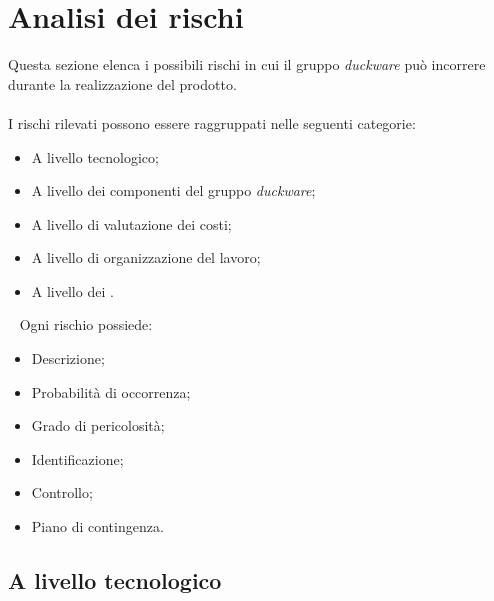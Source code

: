 \clearpage
\section{Analisi dei rischi}
Questa sezione elenca i possibili rischi in cui il gruppo \emph{duckware} può incorrere durante la realizzazione del prodotto.\\
\\
I rischi rilevati possono essere raggruppati nelle seguenti categorie: 
\begin{itemize}
	\item A livello tecnologico; 
	\item A livello dei componenti del gruppo \emph{duckware};
	\item A livello di valutazione dei costi;
	\item A livello di organizzazione del lavoro;
	\item A livello dei .
\end{itemize}
~
Ogni rischio possiede:
	
\begin{itemize}
	\item Descrizione;
	\item Probabilità di occorrenza;
	\item Grado di pericolosità;
	\item Identificazione;
	\item Controllo;
	\item Piano di contingenza.
\end{itemize}

\subsection{A livello tecnologico}
	
